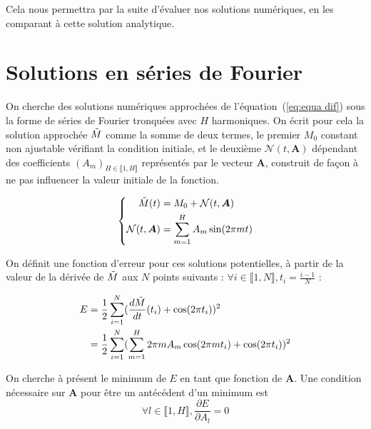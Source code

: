 \documentclass[12pt]{report}
\begin{document}
Cela nous permettra par la suite d'évaluer nos solutions numériques, en les comparant à cette solution analytique.


\section{Solutions en séries de Fourier}

On cherche des solutions numériques approchées de l'équation~(\ref{eq:equa dif}) sous la forme de séries de Fourier tronquées avec $H$ harmoniques.
On écrit pour cela la solution approchée $\Tilde{M}$ comme la somme de deux termes, le premier $M_0$ constant non ajustable vérifiant la condition initiale, et le deuxième $\mathcal{N}(t,\bm{A})$ dépendant des coefficients $(A_m)_{H\in \llbracket 1,H \rrbracket}$ représentés par le vecteur $\bm{A}$, construit de façon à ne pas influencer la valeur initiale de la fonction.

\begin{equation}
\left\{
    \begin{aligned}
        \Tilde{M}(t) &= M_0 + {\mathcal{N}}(t,\bm{A}) \\
        {\mathcal{N}}(t,\bm{A}) &= \sum_{m=1}^{H} A_m \sin(2\pi m t) 
    \end{aligned}
\right.
\label{eq:solution Fourier}
\end{equation}




On définit une fonction d'erreur pour ces solutions potentielles, à partir de la valeur de la dérivée de $\Tilde{M}$ aux $N$ points suivants : $\forall i \in\llbracket 1,N \rrbracket, t_i = \frac{i-1}{N} $ :



\begin{equation}
    \begin{aligned}
        E &= \frac{1}{2}\sum_{i=1}^{N} (\frac{d\Tilde{M}}{dt}(t_i) +\cos(2\pi t_i))^2   \\
          &= \frac{1}{2}\sum_{i=1}^{N}(\sum_{m=1}^{H} 2\pi m A_m \cos(2\pi m t_i)+\cos(2\pi t_i))^2 
    \end{aligned}
\label{eq:fonction d'erreur}
\end{equation}

On cherche à présent le minimum de $E$ en tant que fonction de $\bm{A}$. Une condition nécessaire sur $\bm{A}$ pour être un antécédent d'un minimum est 
\begin{equation}
    {\forall l \in\llbracket 1,H \rrbracket, \frac{\partial E}{\partial A_l} = 0}
    \label{eq:condition nécessaire A_l}
\end{equation}
\end{document}
